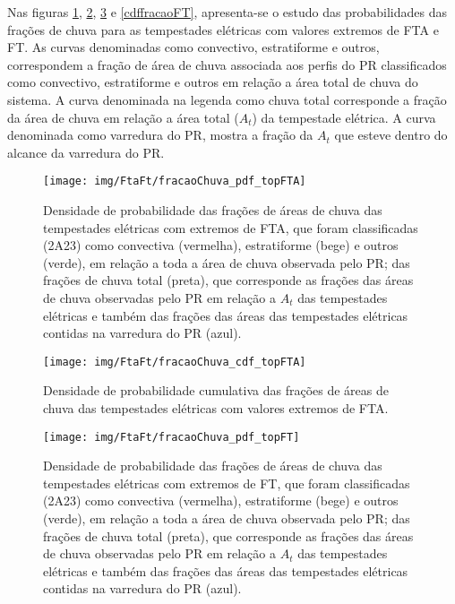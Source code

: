 Nas figuras \ref{pdffracaoFTA}, \ref{cdffracaoFTA}, \ref{pdffracaoFT} e  \ref{cdffracaoFT}, apresenta-se o estudo das probabilidades das frações de chuva para as tempestades elétricas com valores extremos de FTA e FT. As curvas denominadas como convectivo, estratiforme e outros, correspondem a fração de área de chuva associada aos perfis do PR classificados como convectivo, estratiforme e outros em relação a área total de chuva do sistema. A curva denominada na legenda como chuva total corresponde a fração da área de chuva em relação a área total ($A_t$) da tempestade elétrica. A curva denominada como varredura do PR, mostra a fração da $A_t$ que esteve dentro do alcance da varredura do PR.

\begin{figure}[!ht]
  \centering
  \texttt{[image: img/FtaFt/fracaoChuva\_pdf\_topFTA]}   
  \caption{Densidade de probabilidade das frações de áreas de chuva das tempestades elétricas com extremos de FTA, que foram classificadas (2A23) como convectiva (vermelha), estratiforme (bege) e outros (verde), em relação a toda a área de chuva observada pelo PR; das frações de chuva total (preta), que corresponde as frações das áreas de chuva observadas pelo PR em relação a $A_t$ das tempestades elétricas e também das frações das áreas das tempestades elétricas contidas na varredura do PR (azul).}
  \label{pdffracaoFTA}  
\end{figure}

\begin{figure}[!ht]
  \centering 
  \texttt{[image: img/FtaFt/fracaoChuva\_cdf\_topFTA]}
  \caption{Densidade de probabilidade cumulativa das frações de áreas de chuva das tempestades elétricas com valores extremos de FTA.}
  \label{cdffracaoFTA}
\end{figure}


\begin{figure}[!ht]
  \centering
  \texttt{[image: img/FtaFt/fracaoChuva\_pdf\_topFT]}   
  \caption{Densidade de probabilidade das frações de áreas de chuva das tempestades elétricas com extremos de FT, que foram classificadas (2A23) como convectiva (vermelha), estratiforme (bege) e outros (verde), em relação a toda a área de chuva observada pelo PR; das frações de chuva total (preta), que corresponde as frações das áreas de chuva observadas pelo PR em relação a $A_t$ das tempestades elétricas e também das frações das áreas das tempestades elétricas contidas na varredura do PR (azul).}
  \label{pdffracaoFT}  
\end{figure}

